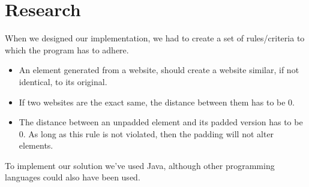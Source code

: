 \chapter{Research}\label{research}
When we designed our implementation, we had to create a set of rules/criteria to which the program has to adhere.
\begin{itemize}
\item An element generated from a website, should create a website similar, if not identical, to its original.
\item If two websites are the exact same, the distance between them has to be 0.
\item The distance between an unpadded element and its padded version has to be 0. As long as this rule is not violated, then the padding will not alter elements.
\end{itemize}
To implement our solution we've used Java, although other programming languages could also have been used.
